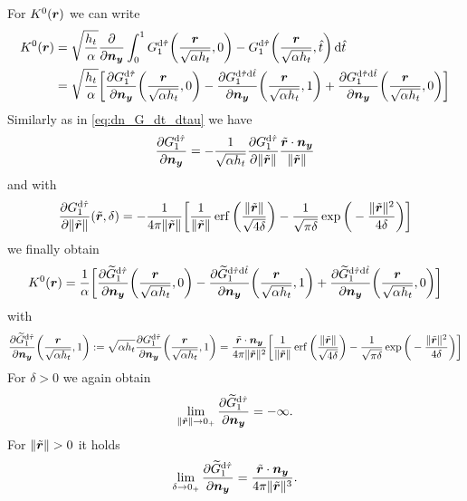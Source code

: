 \documentclass[a4paper,11pt]{article}
\begin{document}
For $K^0({{\bm{r}}})$ we can write
\begin{align*}
  K^0({{\bm{r}}}) &= \sqrt{\frac{h_t}{\alpha}} \frac{\partial}{\partial {\ensuremath{{\bm{n}}}}_{{\bm{y}}}} \int_{0}^{1} G^{{\mathrm{d}}\hat \tau}_1\bigg(\frac{{{\bm{r}}}}{\sqrt{\alpha h_t}},0\bigg) - G^{{\mathrm{d}}\hat \tau}_1\bigg(\frac{{{\bm{r}}}}{\sqrt{\alpha h_t}},\hat t\bigg) \,{\mathrm{d}}\hat t \\
  &= \sqrt{\frac{h_t}{\alpha}} \bigg[ \frac{\partial G^{{\mathrm{d}}\hat \tau}_1}{\partial {\ensuremath{{\bm{n}}}}_{{\bm{y}}}} \bigg(\frac{{{\bm{r}}}}{\sqrt{\alpha h_t}},0\bigg) - \frac{\partial G^{{\mathrm{d}}\hat\tau{\mathrm{d}}\hat t}_1}{\partial {\ensuremath{{\bm{n}}}}_{{\bm{y}}}}\bigg(\frac{{{\bm{r}}}}{\sqrt{\alpha h_t}},1\bigg) + \frac{\partial G^{{\mathrm{d}}\hat\tau{\mathrm{d}}\hat t}_1}{\partial {\ensuremath{{\bm{n}}}}_{{\bm{y}}}}\bigg(\frac{{{\bm{r}}}}{\sqrt{\alpha h_t}},0\bigg) \bigg]
\end{align*}
Similarly as in \eqref{eq:dn_G_dt_dtau} we have
\begin{equation*}
  \frac{\partial G^{{\mathrm{d}}\hat\tau}_1}{\partial {\ensuremath{{\bm{n}}}}_{{\bm{y}}}} = -\frac{1}{\sqrt{\alpha h_t}} \frac{\partial G^{{\mathrm{d}}\hat\tau}_1}{\partial \|\tilde {{{\bm{r}}}}\|} \frac{\tilde {{{\bm{r}}}} \cdot {\ensuremath{{\bm{n}}}}_{{\bm{y}}}}{\|\tilde {{{\bm{r}}}}\|}
\end{equation*}
and with 
\begin{equation*}
  \frac{\partial G^{{\mathrm{d}}\hat\tau}_1}{\partial \|\tilde {{{\bm{r}}}}\|}(\tilde {{{\bm{r}}}},\delta) = -\frac{1}{4\pi\|\tilde{{{\bm{r}}}}\|} \bigg[ \frac{1}{\|\tilde {{{\bm{r}}}}\|} \operatorname{erf}\bigg( \frac{\|\tilde {{{\bm{r}}}}\|}{\sqrt{4\delta}} \bigg) - \frac{1}{\sqrt{\pi\delta}} \exp\bigg( -\frac{\|\tilde {{{\bm{r}}}}\|^2}{4\delta} \bigg) \bigg]
\end{equation*}
we finally obtain
\begin{equation*}
  K^0({{\bm{r}}}) = \frac{1}{\alpha} \bigg[ \frac{\partial \widetilde G^{{\mathrm{d}}\hat \tau}_1}{\partial {\ensuremath{{\bm{n}}}}_{{\bm{y}}}} \bigg(\frac{{{\bm{r}}}}{\sqrt{\alpha h_t}},0\bigg) - \frac{\partial \widetilde G^{{\mathrm{d}}\hat\tau{\mathrm{d}}\hat t}_1}{\partial {\ensuremath{{\bm{n}}}}_{{\bm{y}}}}\bigg(\frac{{{\bm{r}}}}{\sqrt{\alpha h_t}},1\bigg) + \frac{\partial \widetilde G^{{\mathrm{d}}\hat\tau{\mathrm{d}}\hat t}_1}{\partial {\ensuremath{{\bm{n}}}}_{{\bm{y}}}}\bigg(\frac{{{\bm{r}}}}{\sqrt{\alpha h_t}},0\bigg) \bigg]
\end{equation*}
with 
\begin{equation}
\label{eq:dn_G_dtau}
\begin{aligned}
   \frac{\partial \widetilde G^{{\mathrm{d}}\hat\tau}_1}{\partial {\ensuremath{{\bm{n}}}}_{{\bm{y}}}}\bigg(\frac{{{\bm{r}}}}{\sqrt{\alpha h_t}},1\bigg) := \sqrt{\alpha h_t} \frac{\partial G^{{\mathrm{d}}\hat\tau}_1}{\partial {\ensuremath{{\bm{n}}}}_{{\bm{y}}}}\bigg(\frac{{{\bm{r}}}}{\sqrt{\alpha h_t}},1\bigg) = \frac{\tilde {{{\bm{r}}}} \cdot {\ensuremath{{\bm{n}}}}_{{\bm{y}}}}{4\pi\|\tilde{{{\bm{r}}}}\|^2} \bigg[ \frac{1}{\|\tilde {{{\bm{r}}}}\|} \operatorname{erf}\bigg( \frac{\|\tilde {{{\bm{r}}}}\|}{\sqrt{4\delta}} \bigg) - \frac{1}{\sqrt{\pi\delta}} \exp\bigg( -\frac{\|\tilde {{{\bm{r}}}}\|^2}{4\delta} \bigg) \bigg]
\end{aligned}
\end{equation}
For $\delta > 0$ we again obtain
\begin{equation*}
  \lim_{\|\tilde {{{\bm{r}}}}\| \to 0_+} \frac{\partial \widetilde G^{{\mathrm{d}}\hat\tau}_1}{\partial {\ensuremath{{\bm{n}}}}_{{\bm{y}}}} = -\infty.
\end{equation*}
For $\|\tilde {{{\bm{r}}}}\| > 0$ it holds
\begin{equation}
\label{eq:dn_G_dtau_lim_r}
  \lim_{\delta \to 0_+} \frac{\partial \widetilde G^{{\mathrm{d}}\hat\tau}_1}{\partial {\ensuremath{{\bm{n}}}}_{{\bm{y}}}} = \frac{\tilde {{{\bm{r}}}} \cdot {\ensuremath{{\bm{n}}}}_{{\bm{y}}}}{4\pi\|\tilde{{{\bm{r}}}}\|^3}.
\end{equation}
\end{document}
